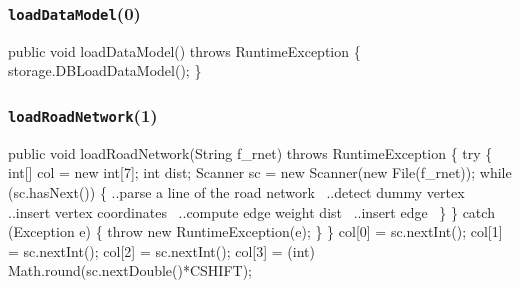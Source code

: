 \documentclass{article}
\def\nwendcode{\endtrivlist \endgroup}      %
\let\nwdocspar=\par
\begin{document}
\subsubsection{{\tt{}loadDataModel}(0)}
\nwenddocs{}\endmoddef{}
public void loadDataModel() throws RuntimeException \{
  storage.DBLoadDataModel();
\}
\nwendcode{}\nwdocspar

\subsubsection{{\tt{}\protect{}loadRoadNetwork}(1)}
\nwenddocs{}\endmoddef{}
public void loadRoadNetwork(String f_rnet) throws RuntimeException \{
  try \{
    int[] col = new int[7];
    int dist;
    Scanner sc = new Scanner(new File(f_rnet));
    while (sc.hasNext()) \{
      \LA{}..parse a line of the road network~{\nwtagstyle{}}\RA{}
      \LA{}..detect dummy vertex~{\nwtagstyle{}}\RA{}
      \LA{}..insert vertex coordinates~{\nwtagstyle{}}\RA{}
      \LA{}..compute edge weight \code{}dist\edoc{}~{\nwtagstyle{}}\RA{}
      \LA{}..insert edge~{\nwtagstyle{}}\RA{}
    \}
  \} catch (Exception e) \{
    throw new RuntimeException(e);
  \}
\}
\eatline
{}\nwendcode{}\endmoddef{}
col[0] = sc.nextInt();
col[1] = sc.nextInt();
col[2] = sc.nextInt();
col[3] = (int) Math.round(sc.nextDouble()*CSHIFT);
\end{document}
